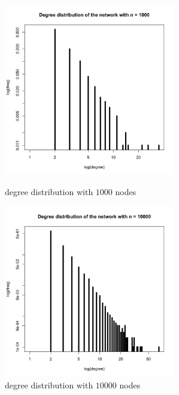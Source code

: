 \documentclass[draftcls,12pt,onecolumn]{IEEEtran}
\begin{document}
\begin{figure}[htbp]
\centering
\begin{minipage}[t]{0.48\textwidth}
\centering
\includegraphics[width=7.5cm]{1_2_d_degsmall.png}
\caption{degree distribution with $1000$ nodes}
\end{minipage}
\begin{minipage}[t]{0.48\textwidth}
\centering
\includegraphics[width=7.5cm]{1_2_d_deglarge.png}
\caption{degree distribution with $10000$ nodes}
\end{minipage}
\end{figure}
\end{document}
